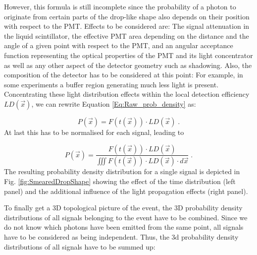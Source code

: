  However, this formula is still incomplete since the probability of a photon to originate from certain parts of the drop-like shape
  also depends on their position with respect to the PMT. 
  Effects to be considered are: The signal attenuation in the liquid scintillator, the effective PMT area depending on the distance and 
  the angle of a given point with respect to the PMT, and an angular acceptance function representing the optical properties of the PMT 
  and its light concentrator as well as any other aspect of the detector geometry such as shadowing. Also, the composition of the 
  detector has to be considered at this point: For example, in some experiments a buffer region generating much less light is present. 
  Concentrating these light distribution effects within the local detection efficiency $LD(\vec{x})$, we can rewrite Equation \ref{Eq:Raw_prob_density} as:
  
  \begin{equation}
    \label{Eq:SinglePhotonDistribution_wo_PM}
    P(\vec{x}) = F(t(\vec{x})) \cdot LD(\vec{x}) \; .
  \end{equation}
  At last this has to be normalised for each signal, leading to
  
  \begin{equation}
    \label{Eq:NormalisedSinglePhotonDistribution_wo_PM}
    P(\vec{x}) = \frac{F(t(\vec{x})) \cdot LD(\vec{x})}{\iiint F(t(\vec{x})) \cdot LD(\vec{x})  \cdot d\vec{x}} \; .
  \end{equation}
  The resulting probability density distribution for a single signal is depicted in Fig. \ref{fig:SmearedDropShape} showing the effect of the time 
  distribution (left panel) and the additional influence of the light propagation effects (right panel).
  
  
  To finally get a 3D topological picture of the event, the 3D probability density distributions of all signals belonging to the event
  have to be combined. Since we do not know which photons have been emitted from the same point, all signals have to be considered as 
  being independent. Thus, the 3d probability density distributions of all signals have to be summed up:
  
